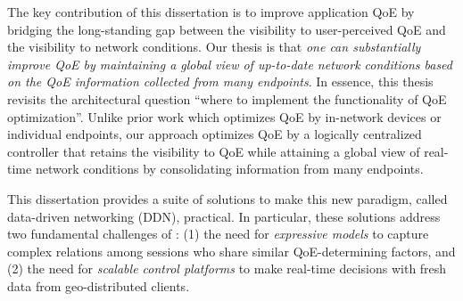 
The key contribution of this dissertation is to improve application QoE by bridging the
long-standing gap between the visibility to user-perceived QoE and the visibility to
network conditions.
Our thesis is  that {\em one can substantially improve QoE by maintaining
a global view of up-to-date network conditions based on the QoE information
collected from many endpoints}.
In essence, this thesis revisits the architectural question ``where to
implement the functionality of QoE optimization''.
Unlike prior work which optimizes QoE by in-network devices or
individual endpoints, our approach optimizes QoE by a logically centralized
controller that retains the visibility to QoE while attaining a global view
of real-time network conditions by consolidating information from many endpoints.

This dissertation provides a suite of solutions to make this new paradigm, called data-driven
networking (DDN), practical. In particular, these solutions address two fundamental challenges 
of \ddn:
(1) the need for {\em expressive models} to capture complex relations among 
sessions who share similar QoE-determining factors, and
(2) the need for {\em scalable control platforms} to make real-time decisions with 
fresh data from geo-distributed clients.

